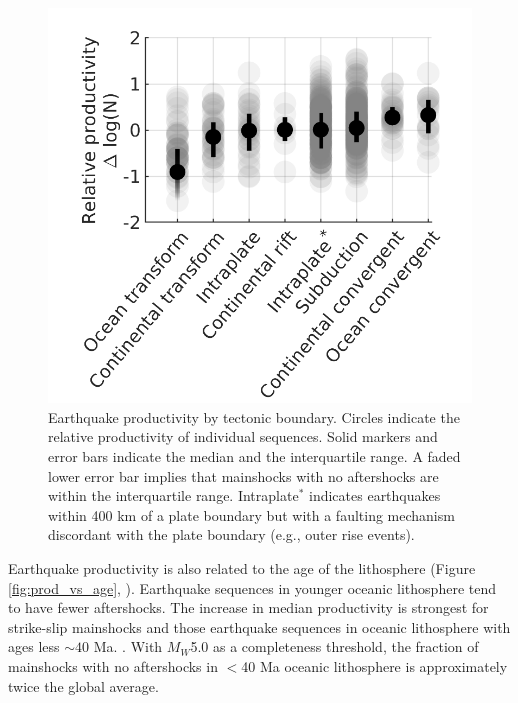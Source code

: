 \documentclass[draft, jgrga]{agujournal2018}
\begin{document}
    \begin{figure}
        \centering
        \includegraphics{figures/prod_by_pb.png}
        \caption{Earthquake productivity by tectonic boundary. Circles indicate the relative productivity of individual sequences. Solid markers and error bars indicate the median and the interquartile range. A faded lower error bar implies that mainshocks with no aftershocks are within the interquartile range. Intraplate$^*$ indicates earthquakes within 400 km of a plate boundary but with a faulting mechanism discordant with the plate boundary (e.g., outer rise events).}
        \label{fig:plate_boundary}
    \end{figure}
    
    Earthquake productivity is also related to the age of the lithosphere  (Figure \ref{fig:prod_vs_age}, ). Earthquake sequences in younger oceanic lithosphere tend to have fewer aftershocks. The increase in median productivity is strongest for strike-slip mainshocks and those earthquake sequences in oceanic lithosphere with ages less $\sim 40$ Ma. . With $M_W$5.0 as a completeness threshold, the fraction of mainshocks with no aftershocks in $<$40 Ma oceanic lithosphere is approximately twice the global average. 
    
\end{document}
